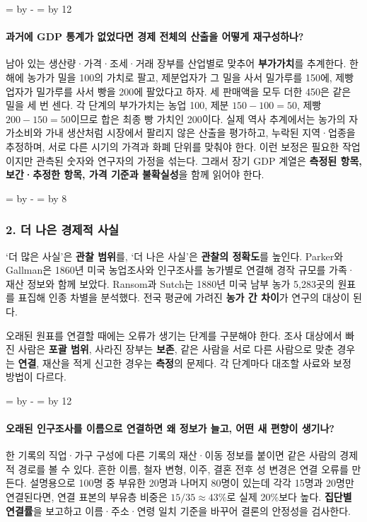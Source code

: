 \documentclass[10pt,a4paper]{article}
\newcommand{\ReserveQuestionSpace}{%
  \par\begingroup
  \dimen0=\pagegoal \advance\dimen0 by -\pagetotal
  \dimen2=\baselineskip \multiply\dimen2 by 12
  \ifdim\dimen0<\dimen2 \newpage\fi
  \endgroup}
\newcommand{\ReserveReadingSectionSpace}{%
  \par\begingroup
  \dimen0=\pagegoal \advance\dimen0 by -\pagetotal
  \dimen2=\baselineskip \multiply\dimen2 by 8
  \ifdim\dimen0<\dimen2 \newpage\fi
  \endgroup}
\begin{document}
\ReserveQuestionSpace
\paragraph{과거에 GDP 통계가 없었다면 경제 전체의 산출을 어떻게 재구성하나?}
남아 있는 생산량·가격·조세·거래 장부를 산업별로 맞추어 \textbf{부가가치}를 추계한다. 한 해에 농가가 밀을 100의 가치로 팔고, 제분업자가 그 밀을 사서 밀가루를 150에, 제빵업자가 밀가루를 사서 빵을 200에 팔았다고 하자. 세 판매액을 모두 더한 450은 같은 밀을 세 번 센다. 각 단계의 부가가치는 농업 100, 제분 $150-100=50$, 제빵 $200-150=50$이므로 합은 최종 빵 가치인 200이다. 실제 역사 추계에서는 농가의 자가소비와 가내 생산처럼 시장에서 팔리지 않은 산출을 평가하고, 누락된 지역·업종을 추정하며, 서로 다른 시기의 가격과 화폐 단위를 맞춰야 한다. 이런 보정은 필요한 작업이지만 관측된 숫자와 연구자의 가정을 섞는다. 그래서 장기 GDP 계열은 \textbf{측정된 항목, 보간·추정한 항목, 가격 기준과 불확실성}을 함께 읽어야 한다.\par

\ReserveReadingSectionSpace
\subsubsection*{2. 더 나은 경제적 사실}

‘더 많은 사실’은 \textbf{관찰 범위}를, ‘더 나은 사실’은 \textbf{관찰의 정확도}를 높인다. Parker와 Gallman은 1860년 미국 농업조사와 인구조사를 농가별로 연결해 경작 규모를 가족·재산 정보와 함께 보았다. Ransom과 Sutch는 1880년 미국 남부 농가 5,283곳의 원표를 표집해 인종 차별을 분석했다. 전국 평균에 가려진 \textbf{농가 간 차이}가 연구의 대상이 된다.\par

오래된 원표를 연결할 때에는 오류가 생기는 단계를 구분해야 한다. 조사 대상에서 빠진 사람은 \textbf{포괄 범위}, 사라진 장부는 \textbf{보존}, 같은 사람을 서로 다른 사람으로 맞춘 경우는 \textbf{연결}, 재산을 적게 신고한 경우는 \textbf{측정}의 문제다. 각 단계마다 대조할 사료와 보정 방법이 다르다.\par

\ReserveQuestionSpace
\paragraph{오래된 인구조사를 이름으로 연결하면 왜 정보가 늘고, 어떤 새 편향이 생기나?}
한 기록의 직업·가구 구성에 다른 기록의 재산·이동 정보를 붙이면 같은 사람의 경제적 경로를 볼 수 있다. 흔한 이름, 철자 변형, 이주, 결혼 전후 성 변경은 연결 오류를 만든다. 설명용으로 100명 중 부유한 20명과 나머지 80명이 있는데 각각 15명과 20명만 연결된다면, 연결 표본의 부유층 비중은 $15/35\approx43\%$로 실제 20\%보다 높다. \textbf{집단별 연결률}을 보고하고 이름·주소·연령 일치 기준을 바꾸어 결론의 안정성을 검사한다.\par
\end{document}

